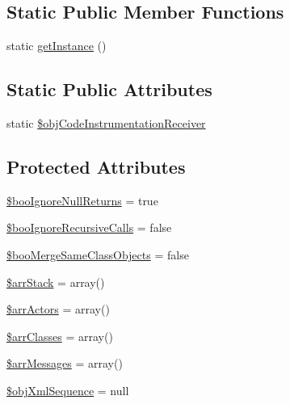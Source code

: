 \subsection*{Static Public Member Functions}
\begin{CompactItemize}
\item 
static \hyperlink{class_code_instrumentation_receiver_7a8b6e3e36c2e6d9fb87f11c8f0aae9b}{getInstance} ()
\end{CompactItemize}
\subsection*{Static Public Attributes}
\begin{CompactItemize}
\item 
static \hyperlink{class_code_instrumentation_receiver_58ceb69302146200d34d39e5f8054301}{\$objCodeInstrumentationReceiver}
\end{CompactItemize}
\subsection*{Protected Attributes}
\begin{CompactItemize}
\item 
\hyperlink{class_code_instrumentation_receiver_9ebcf638caafb0ea92b785a30f8d5cd1}{\$booIgnoreNullReturns} = true
\item 
\hyperlink{class_code_instrumentation_receiver_208637de519d149d33197e681cccb395}{\$booIgnoreRecursiveCalls} = false
\item 
\hyperlink{class_code_instrumentation_receiver_9e8be5e4b9207833e7d3e92e25c5f797}{\$booMergeSameClassObjects} = false
\item 
\hyperlink{class_code_instrumentation_receiver_fb6ce3e590b5b38b793070943bca71f0}{\$arrStack} = array()
\item 
\hyperlink{class_code_instrumentation_receiver_5945968b33462c2a11548cf19ffa66ad}{\$arrActors} = array()
\item 
\hyperlink{class_code_instrumentation_receiver_3f358c2cfe75b8443ba3d0b908fbdd4c}{\$arrClasses} = array()
\item 
\hyperlink{class_code_instrumentation_receiver_231ad79a1ae080f3dda3388819d90247}{\$arrMessages} = array()
\item 
\hyperlink{class_code_instrumentation_receiver_7e81a184fa4092dd95506d434c2660ff}{\$objXmlSequence} = null
\end{CompactItemize}


